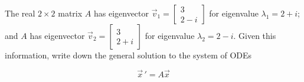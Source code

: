 \documentclass[addpoints,12pt]{exam}
\newcommand{\vv}[2]{\begin{bmatrix} #1 \\ #2 \end{bmatrix}}
\begin{document}
\begin{questions}
 
 \newpage
 
 \question[3] The real $2\times2$ matrix $A$  has eigenvector $\vec v_1=\vv{3}{2-i}$ for eigenvalue $\lambda_1=2+i$; and $A$ has eigenvector  $\vec v_2=\vv{3}{2+i}$ for eigenvalue $\lambda_2=2-i$. Given this information, write down the general solution to the system of ODEs
 
 $$\vec x\,'=A\vec x$$
 
 
 
 
 
\end{questions}
\end{document}
